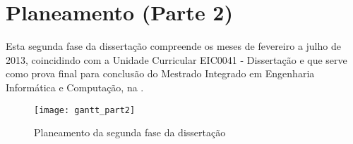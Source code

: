 \chapter{Planeamento (Parte 2)} \label{gantt2}

Esta segunda fase da dissertação compreende os meses de fevereiro a julho de 2013, coincidindo com a Unidade Curricular EIC0041 - Dissertação e que serve como prova final para conclusão do Mestrado Integrado em Engenharia Informática e Computação, na \Feup.

\begin{figure}[t]
  \begin{center}
    \leavevmode
    \texttt{[image: gantt\_part2]}
    \caption{Planeamento da segunda fase da dissertação}
    \label{fig:gantt2}
  \end{center}
\end{figure}
